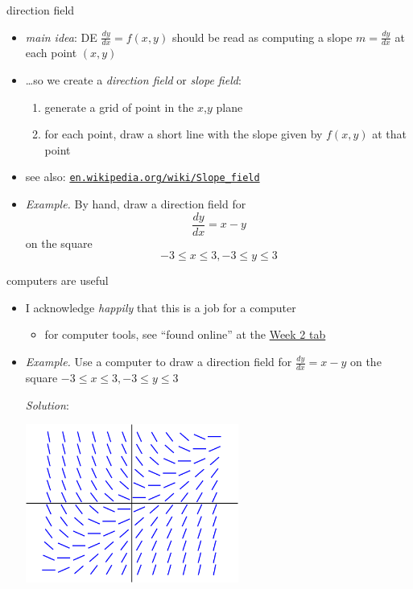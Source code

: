\documentclass{beamer}
\begin{document}
\begin{frame}{direction field}

\begin{itemize}
\item \emph{main idea}: DE $\frac{dy}{dx} = f(x,y)$ should be read as computing a slope $m=\frac{dy}{dx}$ at each  point $(x,y)$
\item \dots so we create a \emph{direction field} or \emph{slope field}:
    \begin{enumerate}
    \item generate a grid of point in the $x$,$y$ plane
    \item for each point, draw a short line with the slope given by $f(x,y)$ at that point
    \end{enumerate}
\item see also: \small \href{https://en.wikipedia.org/wiki/Slope_field}{\color{blue} \texttt{en.wikipedia.org/wiki/Slope\_field}} \normalsize

\bigskip
\item \begin{minipage}[t]{0.375\textwidth}
\emph{Example.}  By hand, draw a direction field for
$$\frac{dy}{dx} = x-y$$
on the square
$$-3 \le x \le 3, -3 \le y \le 3$$
\end{minipage} 

\vspace{20mm}
\end{itemize}
\end{frame}


\begin{frame}{computers are useful}

\begin{itemize}
\item I acknowledge \emph{happily} that this is a job for a computer
    \begin{itemize}
    \item for computer tools,  see ``found online'' at the \href{https://bueler.github.io/math302/week2.html}{\color{blue} Week 2 tab}
    \end{itemize}
\item \emph{Example.}  Use a computer to draw a direction field for
$\frac{dy}{dx} = x-y$ on the square $-3 \le x \le 3, -3 \le y \le 3$

\bigskip
\emph{Solution}:

\vspace{-3mm}
\hfill \includegraphics[width=0.55\textwidth]{figs/example-field} \phantom{as dfjadl dsf}
\end{itemize}
\end{frame}
\end{document}
